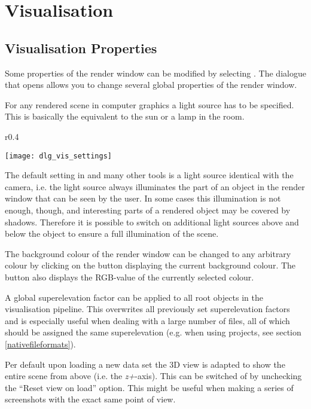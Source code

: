 \chapter{Visualisation}

\section{Visualisation Properties}

Some properties of the render window can be modified by selecting  . The dialogue that opens allows you to change several global properties of the render window.

For any rendered scene in computer graphics a light source has to be specified. This is basically the equivalent to the sun or a lamp in the room.
\begin{wrapfigure}{r}{0.4\textwidth}
   \vspace{-15px}
   \begin{center}
     \texttt{[image: dlg\_vis\_settings]}
   \end{center}
   \vspace{-20px}
\end{wrapfigure}
The default setting in \ogs and many other tools is a light source identical with the camera, i.e. the light source always illuminates the part of an object in the render window that can be seen by the user. In some cases this illumination is not enough, though, and interesting parts of a rendered object may be covered by shadows. Therefore it is possible to switch on additional light sources above and below the object to ensure a full illumination of the scene.

The background colour of the render window can be changed to any arbitrary colour by clicking on the button displaying the current background colour. The button also displays the RGB-value of the currently selected colour.

A global superelevation factor can be applied to all root objects in the visualisation pipeline. This overwrites all previously set superelevation factors and is especially useful when dealing with a large number of files, all of which should be assigned the same superelevation (e.g. when using \ogs projects, see section \ref{nativefileformats}).

Per default upon loading a new data set the 3D view is adapted to show the entire scene from above (i.e. the \emph{z+}-axis). This can be switched of by unchecking the ``Reset view on load'' option. This might be useful when making a series of screenshots with the exact same point of view.

